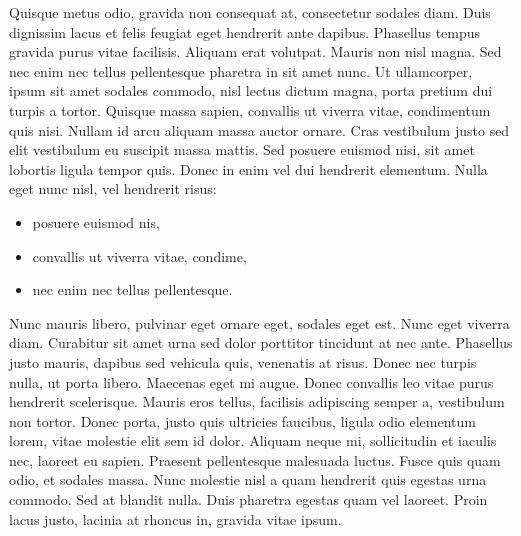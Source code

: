 Quisque metus odio, gravida non consequat at, consectetur sodales diam. Duis dignissim lacus et felis feugiat eget hendrerit ante dapibus. Phasellus tempus gravida purus vitae facilisis. Aliquam erat volutpat. Mauris non nisl magna. Sed nec enim nec tellus pellentesque pharetra in sit amet nunc. Ut ullamcorper, ipsum sit amet sodales commodo, nisl lectus dictum magna, porta pretium dui turpis a tortor. Quisque massa sapien, convallis ut viverra vitae, condimentum quis nisi. Nullam id arcu aliquam massa auctor ornare. Cras vestibulum justo sed elit vestibulum eu suscipit massa mattis. Sed posuere euismod nisi, sit amet lobortis ligula tempor quis. Donec in enim vel dui hendrerit elementum. Nulla eget nunc nisl, vel hendrerit risus:
\begin{itemize}
 \item posuere euismod nis,
 \item convallis ut viverra vitae, condime,
 \item nec enim nec tellus pellentesque. 
\end{itemize}
Nunc mauris libero, pulvinar eget ornare eget, sodales eget est. Nunc eget viverra diam. Curabitur sit amet urna sed dolor porttitor tincidunt at nec ante. Phasellus justo mauris, dapibus sed vehicula quis, venenatis at risus. Donec nec turpis nulla, ut porta libero. Maecenas eget mi augue. Donec convallis leo vitae purus hendrerit scelerisque. Mauris eros tellus, facilisis adipiscing semper a, vestibulum non tortor. Donec porta, justo quis ultricies faucibus, ligula odio elementum lorem, vitae molestie elit sem id dolor. Aliquam neque mi, sollicitudin et iaculis nec, laoreet eu sapien. Praesent pellentesque malesuada luctus. Fusce quis quam odio, et sodales massa. Nunc molestie nisl a quam hendrerit quis egestas urna commodo. Sed at blandit nulla. Duis pharetra egestas quam vel laoreet. Proin lacus justo, lacinia at rhoncus in, gravida vitae ipsum. 